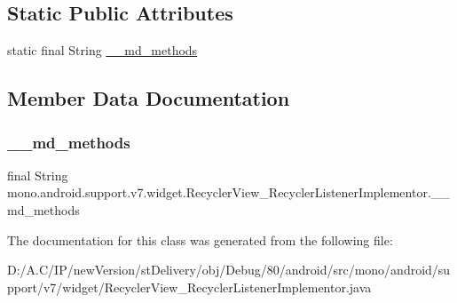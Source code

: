 \subsection*{Static Public Attributes}
\begin{DoxyCompactItemize}
\item 
static final String \hyperlink{classmono_1_1android_1_1support_1_1v7_1_1widget_1_1_recycler_view___recycler_listener_implementor_aa5a0aa7a98140d109a11d924d7dbd6aa}{\+\_\+\+\_\+md\+\_\+methods}
\end{DoxyCompactItemize}


\subsection{Member Data Documentation}
\mbox{\label{classmono_1_1android_1_1support_1_1v7_1_1widget_1_1_recycler_view___recycler_listener_implementor_aa5a0aa7a98140d109a11d924d7dbd6aa}} 
\subsubsection{\texorpdfstring{\+\_\+\+\_\+md\+\_\+methods}{\_\_md\_methods}}
{\footnotesize\ttfamily final String mono.\+android.\+support.\+v7.\+widget.\+Recycler\+View\+\_\+\+Recycler\+Listener\+Implementor.\+\_\+\+\_\+md\+\_\+methods\hspace{0.3cm}{\ttfamily [static]}}



The documentation for this class was generated from the following file\+:\begin{DoxyCompactItemize}
\item 
D\+:/\+A.\+C/\+I\+P/new\+Version/st\+Delivery/obj/\+Debug/80/android/src/mono/android/support/v7/widget/Recycler\+View\+\_\+\+Recycler\+Listener\+Implementor.\+java\end{DoxyCompactItemize}

